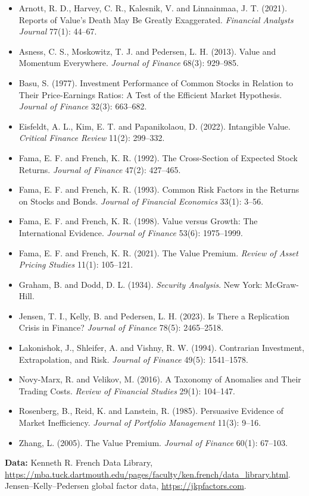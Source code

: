 \begin{itemize}
  \item Arnott, R. D., Harvey, C. R., Kalesnik, V. and Linnainmaa, J. T. (2021). Reports of Value's Death May Be Greatly Exaggerated. \emph{Financial Analysts Journal} 77(1): 44--67.
  \item Asness, C. S., Moskowitz, T. J. and Pedersen, L. H. (2013). Value and Momentum Everywhere. \emph{Journal of Finance} 68(3): 929--985.
  \item Basu, S. (1977). Investment Performance of Common Stocks in Relation to Their Price-Earnings Ratios: A Test of the Efficient Market Hypothesis. \emph{Journal of Finance} 32(3): 663--682.
  \item Eisfeldt, A. L., Kim, E. T. and Papanikolaou, D. (2022). Intangible Value. \emph{Critical Finance Review} 11(2): 299--332.
  \item Fama, E. F. and French, K. R. (1992). The Cross-Section of Expected Stock Returns. \emph{Journal of Finance} 47(2): 427--465.
  \item Fama, E. F. and French, K. R. (1993). Common Risk Factors in the Returns on Stocks and Bonds. \emph{Journal of Financial Economics} 33(1): 3--56.
  \item Fama, E. F. and French, K. R. (1998). Value versus Growth: The International Evidence. \emph{Journal of Finance} 53(6): 1975--1999.
  \item Fama, E. F. and French, K. R. (2021). The Value Premium. \emph{Review of Asset Pricing Studies} 11(1): 105--121.
  \item Graham, B. and Dodd, D. L. (1934). \emph{Security Analysis}. New York: McGraw-Hill.
  \item Jensen, T. I., Kelly, B. and Pedersen, L. H. (2023). Is There a Replication Crisis in Finance? \emph{Journal of Finance} 78(5): 2465--2518.
  \item Lakonishok, J., Shleifer, A. and Vishny, R. W. (1994). Contrarian Investment, Extrapolation, and Risk. \emph{Journal of Finance} 49(5): 1541--1578.
  \item Novy-Marx, R. and Velikov, M. (2016). A Taxonomy of Anomalies and Their Trading Costs. \emph{Review of Financial Studies} 29(1): 104--147.
  \item Rosenberg, B., Reid, K. and Lanstein, R. (1985). Persuasive Evidence of Market Inefficiency. \emph{Journal of Portfolio Management} 11(3): 9--16.
  \item Zhang, L. (2005). The Value Premium. \emph{Journal of Finance} 60(1): 67--103.
\end{itemize}

\textbf{Data:} Kenneth R. French Data Library, \url{https://mba.tuck.dartmouth.edu/pages/faculty/ken.french/data_library.html}. Jensen--Kelly--Pedersen global factor data, \url{https://jkpfactors.com}.
